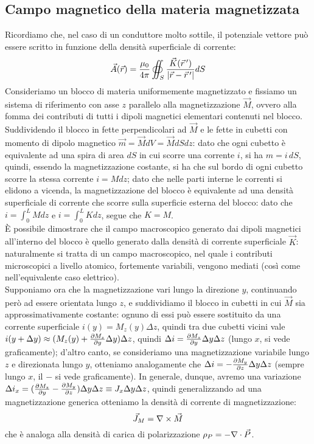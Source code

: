\documentclass[]{article}
\begin{document}
\subsection{Campo magnetico della materia magnetizzata}

Ricordiamo che, nel caso di un conduttore molto sottile, il potenziale vettore può essere scritto in funzione della densità superficiale di corrente:
\begin{equation}
	\vec{A}(\vec{r}) = \frac{\mu_0}{4\pi} \oiint_S \frac{\vec{K}(\vec{r}\,')}{\left\lvert\vec{r} - \vec{r}\,'\right\rvert} dS
	\label{eq:12}
\end{equation}
Consideriamo un blocco di materia uniformemente magnetizzato e fissiamo un sistema di riferimento con asse $ z $ parallelo alla magnetizzazione $ \vec{M} $, ovvero alla fomma dei contributi di tutti i dipoli magnetici elementari contenuti nel blocco. \\ 
%
Suddividendo il blocco in fette perpendicolari ad $ \vec{M} $ e le fette in cubetti con momento di dipolo magnetico $ \vec{m} = \vec{M} dV = \vec{M} dSdz $: dato che ogni cubetto è equivalente ad una spira di area $ dS $ in cui scorre una corrente $ i $, si ha $ m = i \,dS $, quindi, essendo la magnetizzazione costante, si ha che sul bordo di ogni cubetto scorre la stessa corrente $ i = M dz $; dato che nelle parti interne le correnti si elidono a vicenda, la magnetizzazione del blocco è equivalente ad una densità superficiale di corrente che scorre sulla superficie esterna del blocco: dato che $ i = \int_0^L M dz $ e $ i = \int_0^L K dz $, segue che $ K = M $. \\ 
%
È possibile dimostrare che il campo macroscopico generato dai dipoli magnetici all'interno del blocco è quello generato dalla densità di corrente superficiale $ \vec{K} $: naturalmente si tratta di un campo macroscopico, nel quale i contributi microscopici a livello atomico, fortemente variabili, vengono mediati (così come nell'equivalente caso elettrico). \\ 
%
Supponiamo ora che la magnetizzazione vari lungo la direzione $ y $, continuando però ad essere orientata lungo $ z $, e suddividiamo il blocco in cubetti in cui $ \vec{M} $ sia approssimativamente costante: ognuno di essi può essere sostituito da una corrente superficiale $ i(y) = M_z(y) \Delta z $, quindi tra due cubetti vicini vale $ i(y+\Delta y) \approx (M_z(y) + \frac{\partial M_z}{\partial y}\Delta y) \Delta z $, quindi $ \Delta i = \frac{\partial M_z}{\partial y} \Delta y \Delta z $ (lungo $ x $, si vede graficamente); d'altro canto, se consideriamo una magnetizzazione variabile lungo $ z $ e direzionata lungo $ y $, otteniamo analogamente che $ \Delta i = - \frac{\partial M_y}{\partial z} \Delta y \Delta z $ (sempre lungo $ x $, il $ - $ si vede graficamente). In generale, dunque, avremo una variazione $ \Delta i_x = (\frac{\partial M_z}{\partial y} - \frac{\partial M_y}{\partial z}) \Delta y \Delta z \equiv J_x \Delta y \Delta z $, quindi generalizzando ad una magnetizzazione generica otteniamo la densità di corrente di magnetizzazione:
\begin{equation}
	\vec{J}_M = \nabla\times\vec{M}
	\label{eq:13}
\end{equation}
che è analoga alla densità di carica di polarizzazione $ \rho_P = -\nabla\cdot\vec{P} $. 
\end{document}
